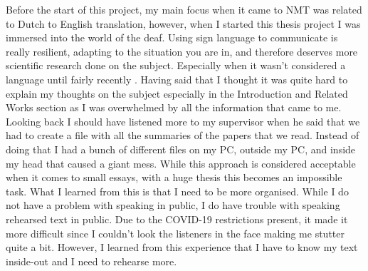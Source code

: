 Before the start of this project, my main focus when it came to NMT was related to Dutch to English translation, however, when I started this thesis project I was immersed into the world of the deaf. Using sign language to communicate is really resilient, adapting to the situation you are in, and therefore deserves more scientific research done on the subject. Especially when it wasn't considered a language until fairly recently \cite{stokoe2005sign}. Having said that I thought it was quite hard to explain my thoughts on the subject especially in the Introduction and Related Works section as I was overwhelmed by all the information that came to me. Looking back I should have listened more to my supervisor when he said that we had to create a file with all the summaries of the papers that we read. Instead of doing that I had a bunch of different files on my PC, outside my PC, and inside my head that caused a giant mess. While this approach is considered acceptable when it comes to small essays, with a huge thesis this becomes an impossible task. What I learned from this is that I need to be more organised.
While I do not have a problem with speaking in public, I do have trouble with speaking rehearsed text in public. Due to the COVID-19 restrictions present, it made it more difficult since I couldn't look the listeners in the face making me stutter quite a bit. However, I learned from this experience that I have to know my text inside-out and I need to rehearse more.



